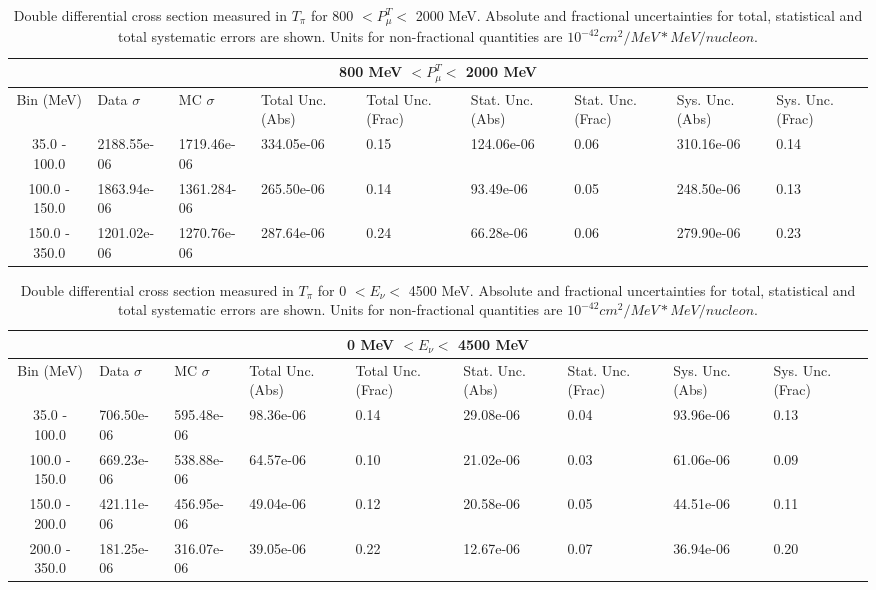 \begin{table}[!htb]
    \centering
    \tiny
    \begin{tabular}{|c|p{0.5in}|p{0.5in}|p{0.5in}|p{0.5in}|p{0.5in}|p{0.5in}|p{0.5in}|p{0.5in}|}

        \hline
        \multicolumn{9}{c}{800 MeV $ < P^T_\mu < $ 2000 MeV}\\
        \hline
        Bin (MeV)& Data $\sigma$ & MC $\sigma$ & Total Unc. (Abs) & Total Unc. (Frac)  & Stat. Unc. (Abs) & Stat. Unc. (Frac) & Sys. Unc. (Abs) & Sys. Unc. (Frac)\\ \hline
35.0 - 100.0 & 2188.55e-06 & 1719.46e-06 & 334.05e-06 & 0.15 & 124.06e-06 & 0.06 & 310.16e-06 & 0.14\\ \hline
100.0 - 150.0 & 1863.94e-06 & 1361.284-06 & 265.50e-06 & 0.14 & 93.49e-06 & 0.05 & 248.50e-06 & 0.13\\ \hline
150.0 - 350.0 & 1201.02e-06 & 1270.76e-06 & 287.64e-06 & 0.24 & 66.28e-06 & 0.06 & 279.90e-06 & 0.23\\ \hline

    \end{tabular}
    \caption{Double differential cross section measured in $T_\pi$ for 800 $ < P^T_\mu < $ 2000 MeV. Absolute and fractional uncertainties for total, statistical and total systematic errors are shown. Units for non-fractional quantities are $10^{-42}cm^2/MeV*MeV/nucleon$.}
    \label{tab:ApdxA:XSecTable2Dtpiptmu5}
\end{table}




\begin{table}[!htb]
    \centering
    \tiny
    \begin{tabular}{|c|p{0.5in}|p{0.5in}|p{0.5in}|p{0.5in}|p{0.5in}|p{0.5in}|p{0.5in}|p{0.5in}|}

        \hline
        \multicolumn{9}{c}{0 MeV $ < E_\nu < $ 4500 MeV}\\
        \hline
        Bin (MeV)& Data $\sigma$ & MC $\sigma$ & Total Unc. (Abs) & Total Unc. (Frac)  & Stat. Unc. (Abs) & Stat. Unc. (Frac) & Sys. Unc. (Abs) & Sys. Unc. (Frac)\\ \hline
35.0 - 100.0 & 706.50e-06 & 595.48e-06 & 98.36e-06 & 0.14 & 29.08e-06 & 0.04 & 93.96e-06 & 0.13\\ \hline
100.0 - 150.0 & 669.23e-06 & 538.88e-06 & 64.57e-06 & 0.10 & 21.02e-06 & 0.03 & 61.06e-06 & 0.09\\ \hline
150.0 - 200.0 & 421.11e-06 & 456.95e-06 & 49.04e-06 & 0.12 & 20.58e-06 & 0.05 & 44.51e-06 & 0.11\\ \hline
200.0 - 350.0 & 181.25e-06 & 316.07e-06 & 39.05e-06 & 0.22 & 12.67e-06 & 0.07 & 36.94e-06 & 0.20\\ \hline


    \end{tabular}
    \caption{Double differential cross section measured in $T_\pi$ for 0 $ < E_\nu < $ 4500 MeV. Absolute and fractional uncertainties for total, statistical and total systematic errors are shown. Units for non-fractional quantities are $10^{-42}cm^2/MeV*MeV/nucleon$.}
    \label{tab:ApdxA:XSecTable2Dtpienu1}
\end{table}


